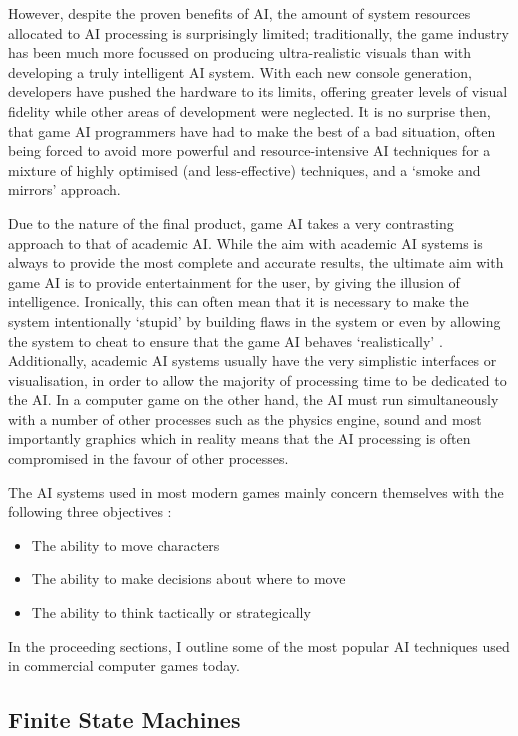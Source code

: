 \documentclass[a4paper,oneside]{report}
\begin{document}
However, despite the proven benefits of AI, the amount of system resources allocated to AI processing is surprisingly limited; traditionally, the game industry has been much more focussed on producing ultra-realistic visuals than with developing a truly intelligent AI system. With each new console generation, developers have pushed the hardware to its limits, offering greater levels of visual fidelity while other areas of development were neglected. It is no surprise then, that game AI programmers have had to make the best of a bad situation, often being forced to avoid  more powerful and resource-intensive AI techniques for a mixture of highly optimised (and less-effective) techniques, and a `smoke and mirrors' approach.

Due to the nature of the final product, game AI takes a very contrasting approach to that of academic AI. While the aim with academic AI systems is always to provide the most complete and accurate results, the ultimate aim with game AI is to provide entertainment for the user, by giving the illusion of intelligence. Ironically, this can often mean that it is necessary to make the system intentionally `stupid' by building flaws in the system or even by allowing the system to cheat to ensure that the game AI behaves `realistically' \cite{Liden:2004fk}. Additionally, academic AI systems usually have the very simplistic interfaces or visualisation, in order to allow the majority of processing time to be dedicated to the AI. In a computer game on the other hand, the AI must run simultaneously with a number of other processes such as the physics engine, sound and most importantly graphics which in reality means that the AI processing is often compromised in the favour of other processes.

The AI systems used in most modern games mainly concern themselves with the following three objectives \cite{millington2006artificial}:

\begin{itemize}
	\item The ability to move characters
	\item The ability to make decisions about where to move
	\item The ability to think tactically or strategically
\end{itemize}

In the proceeding sections, I outline some of the most popular AI techniques used in commercial computer games today.

\subsection{Finite State Machines} 
\end{document}
